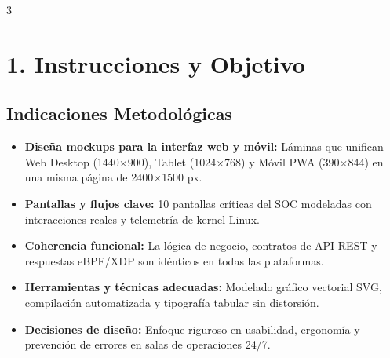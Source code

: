 \documentclass[11pt]{article}
\begin{document}
\begin{multicols}{3}

\section*{\color{primarydark}\Large 1. Instrucciones y Objetivo}

\noindent{}

\vspace{6bp}

\noindent{}

\vspace{6bp}
\subsection*{\color{primary}Indicaciones Metodológicas}
\begin{itemize}[leftmargin=12bp, itemsep=2bp]
    \item \textbf{Diseña mockups para la interfaz web y móvil:} Láminas que unifican Web Desktop (1440$\times$900), Tablet (1024$\times$768) y Móvil PWA (390$\times$844) en una misma página de 2400$\times$1500 px.
    \item \textbf{Pantallas y flujos clave:} 10 pantallas críticas del SOC modeladas con interacciones reales y telemetría de kernel Linux.
    \item \textbf{Coherencia funcional:} La lógica de negocio, contratos de API REST y respuestas eBPF/XDP son idénticos en todas las plataformas.
    \item \textbf{Herramientas y técnicas adecuadas:} Modelado gráfico vectorial SVG, compilación automatizada y tipografía tabular sin distorsión.
    \item \textbf{Decisiones de diseño:} Enfoque riguroso en usabilidad, ergonomía y prevención de errores en salas de operaciones 24/7.
\end{itemize}


\end{multicols}
\end{document}
